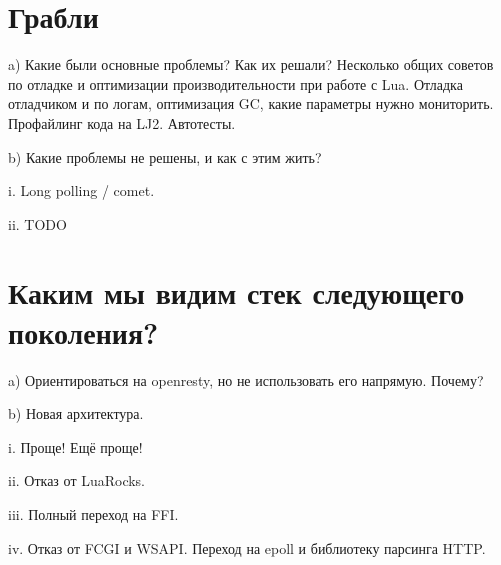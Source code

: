 \documentclass[aspectratio=169,handout]{beamer}
\begin{document}

\section{Грабли}

\begin{frame}
a) Какие были основные проблемы? Как их решали? Несколько общих советов по отладке и оптимизации производительности при работе с Lua. Отладка отладчиком и по логам, оптимизация GC, какие параметры нужно мониторить. Профайлинг кода на LJ2. Автотесты.
\end{frame}

\begin{frame}
b) Какие проблемы не решены, и как с этим жить?
\end{frame}

\begin{frame}
i. Long polling / comet.
\end{frame}

\begin{frame}
ii. TODO
\end{frame}


\section{Каким мы видим стек следующего поколения?}

\begin{frame}
a) Ориентироваться на openresty, но не использовать его напрямую. Почему?
\end{frame}

\begin{frame}
b) Новая архитектура.
\end{frame}

\begin{frame}
i. Проще! Ещё проще!
\end{frame}

\begin{frame}
ii. Отказ от LuaRocks.
\end{frame}

\begin{frame}
iii. Полный переход на FFI.
\end{frame}

\begin{frame}
iv. Отказ от FCGI и WSAPI. Переход на epoll и библиотеку парсинга HTTP.
\end{frame}
\end{document}
